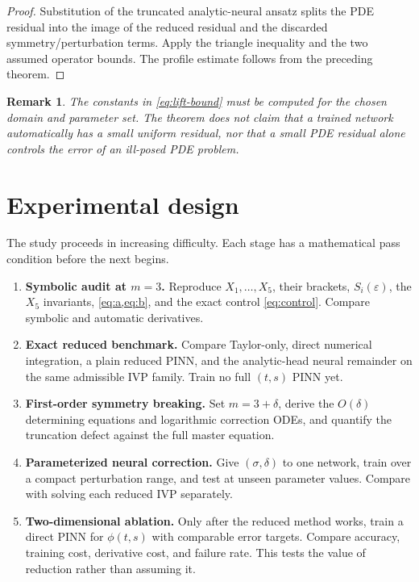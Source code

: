 \documentclass[11pt]{article}
\newcommand{\eps}{\varepsilon}
\newtheorem{remark}[definition]{Remark}
\begin{document}
\begin{proof}
Substitution of the truncated analytic-neural ansatz splits the PDE residual into the image of the reduced residual and the discarded symmetry/perturbation terms.  Apply the triangle inequality and the two assumed operator bounds.  The profile estimate follows from the preceding theorem.
\end{proof}

\begin{remark}
The constants in \cref{eq:lift-bound} must be computed for the chosen domain and parameter set.  The theorem does not claim that a trained network automatically has a small uniform residual, nor that a small PDE residual alone controls the error of an ill-posed PDE problem.
\end{remark}

\section{Experimental design}

The study proceeds in increasing difficulty.  Each stage has a mathematical pass condition before the next begins.

\begin{enumerate}[label=\textbf{Stage \arabic*.}]
\item \textbf{Symbolic audit at $m=3$.} Reproduce $X_1,\ldots,X_5$, their brackets, $S_i(\eps)$, the $X_5$ invariants, \cref{eq:a,eq:b}, and the exact control \cref{eq:control}.  Compare symbolic and automatic derivatives.
\item \textbf{Exact reduced benchmark.} Compare Taylor-only, direct numerical integration, a plain reduced PINN, and the analytic-head neural remainder on the same admissible IVP family.  Train no full $(t,s)$ PINN yet.
\item \textbf{First-order symmetry breaking.} Set $m=3+\delta$, derive the $O(\delta)$ determining equations and logarithmic correction ODEs, and quantify the truncation defect against the full master equation.
\item \textbf{Parameterized neural correction.} Give $(\sigma,\delta)$ to one network, train over a compact perturbation range, and test at unseen parameter values.  Compare with solving each reduced IVP separately.
\item \textbf{Two-dimensional ablation.} Only after the reduced method works, train a direct PINN for $\phi(t,s)$ with comparable error targets.  Compare accuracy, training cost, derivative cost, and failure rate.  This tests the value of reduction rather than assuming it.
\end{enumerate}
\end{document}
